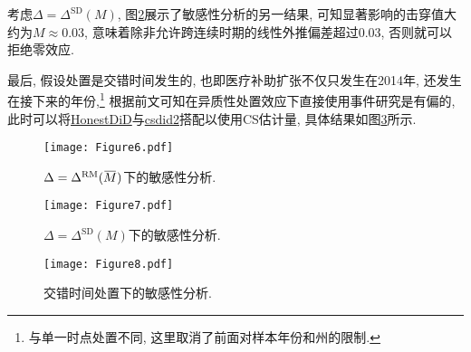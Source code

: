 \documentclass[cn,blue,14pt,screen,bibstyle=gb7714-2015]{elegantnote}
\newcommand{\overbar}[1]{\mkern 1.5mu\overline{\mkern-1.5mu#1\mkern-1.5mu}\mkern 1.5mu}
\begin{document}
考虑$\Delta=\Delta^\text{SD}(M)$, 图\ref{Figure7}展示了敏感性分析的另一结果, 可知显著影响的击穿值大约为$M\approx 0.03$, 意味着除非允许跨连续时期的线性外推偏差超过0.03, 否则就可以拒绝零效应.

最后, 假设处置是交错时间发生的, 也即医疗补助扩张不仅只发生在2014年, 还发生在接下来的年份,\footnote{与单一时点处置不同, 这里取消了前面对样本年份和州的限制.} 根据前文可知在异质性处置效应下直接使用事件研究是有偏的, 此时可以将\href{https://github.com/mcaceresb/stata-honestdid}{HonestDiD}与\href{https://github.com/friosavila/csdid2}{csdid2}搭配以使用CS估计量, 具体结果如图\ref{Figure8}所示.

\begin{figure}
  \centering
  \texttt{[image: Figure6.pdf]}
  \caption{$\Delta=\Delta^\text{RM}(\overbar{M})$下的敏感性分析.}\label{Figure6}
\end{figure}


\begin{figure}
  \centering
  \texttt{[image: Figure7.pdf]}
  \caption{$\Delta=\Delta^\text{SD}(M)$下的敏感性分析.}\label{Figure7}
\end{figure}

\begin{figure}
  \centering
  \texttt{[image: Figure8.pdf]}
  \caption{交错时间处置下的敏感性分析.}\label{Figure8}
\end{figure}
\newpage

\nocite{Andrews2023inference}
\nocite{baker2022much}
\nocite{callaway2021difference}
\nocite{cengiz2019effect}
\nocite{de2020two}
\nocite{goodman2021difference}
\nocite{miller2023introductory}
\nocite{rambachan2023more}
\nocite{roth2022pretest}
\nocite{roth2023s}
\nocite{stevenson2006bargaining}
\nocite{sun2021estimating}
\nocite{Zhang2023}
\printbibliography[heading=bibintoc, title=\ebibname]
\end{document}
